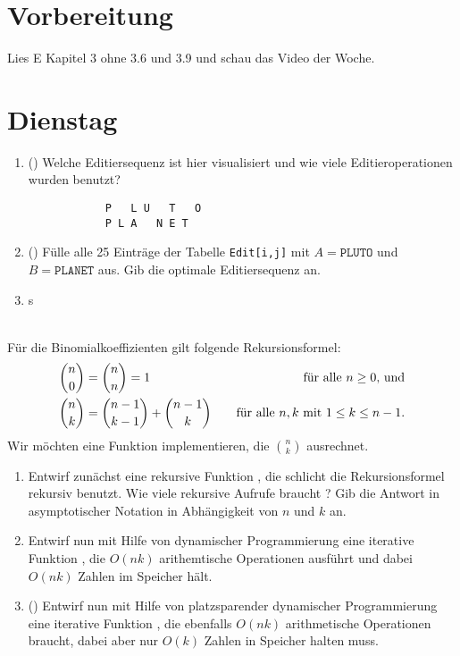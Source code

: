 \documentclass{uebung_cs}
\begin{document}
\section*{Vorbereitung}
Lies E Kapitel 3 ohne 3.6 und 3.9 und schau das Video der Woche.

\section*{Dienstag}
\begin{aufgabe}\mbox{}
    \begin{enumerate}
        \item(\warmup) Welche Editiersequenz ist hier visualisiert und wie viele Editieroperationen wurden benutzt?
        \begin{verbatim}
            P   L U   T   O
            P L A   N E T
        \end{verbatim}
        \item(\warmup) Fülle alle 25 Einträge der Tabelle \texttt{Edit[i,j]} mit $A=\texttt{PLUTO}$ und $B=\texttt{PLANET}$ aus. Gib die optimale Editiersequenz an.
        \item s
    \end{enumerate}
\end{aufgabe}

\begin{aufgabe}\mbox{}\\
    Für die Binomialkoeffizienten gilt folgende Rekursionsformel:
    \begin{align*}
        \binom{n}{0}&=\binom{n}{n}=1&\quad\text{für alle $n\ge 0$, und}\\
        \binom{n}{k}&=\binom{n-1}{k-1}+\binom{n-1}{k}&\quad\text{für alle $n,k$ mit $ 1\le k \le n-1$.}
    \end{align*}
    Wir möchten eine Funktion implementieren, die $\binom{n}{k}$ ausrechnet.
    \begin{enumerate}
        \item Entwirf zunächst eine rekursive Funktion , die schlicht die Rekursionsformel rekursiv benutzt. Wie viele rekursive Aufrufe braucht ? Gib die Antwort in asymptotischer Notation in Abhängigkeit von $n$ und $k$ an.
        \item Entwirf nun mit Hilfe von dynamischer Programmierung eine iterative Funktion , die $O(nk)$ arithemtische Operationen ausführt und dabei $O(nk)$ Zahlen im Speicher hält.
        \item (\hard) Entwirf nun mit Hilfe von platzsparender dynamischer Programmierung eine iterative Funktion , die ebenfalls $O(nk)$ arithmetische Operationen braucht, dabei aber nur $O(k)$ Zahlen in Speicher halten muss.
    \end{enumerate}
\end{aufgabe}
\end{document}
